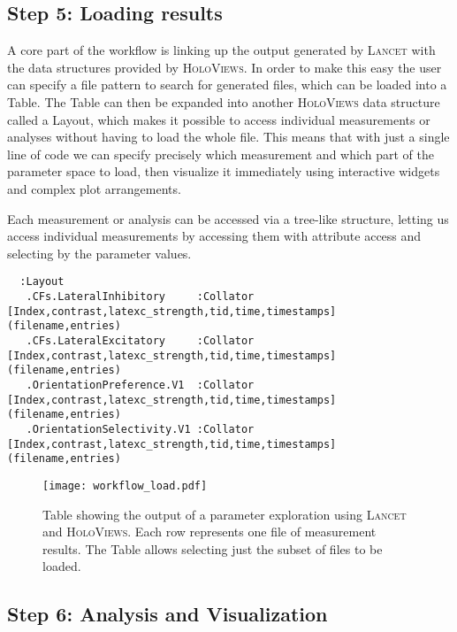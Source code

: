 \subsection{Step 5: Loading results}

A core part of the workflow is linking up the output generated by
\textsc{Lancet} with the data structures provided by
\textsc{HoloViews}. In order to make this easy the user can specify a
file pattern to search for generated files, which can be loaded into a
Table. The Table can then be expanded into another \textsc{HoloViews}
data structure called a Layout, which makes it possible to access
individual measurements or analyses without having to load the whole
file. This means that with just a single line of code we can specify
precisely which measurement and which part of the parameter space to
load, then visualize it immediately using interactive widgets and
complex plot arrangements.

Each measurement or analysis can be accessed via a tree-like
structure, letting us access individual measurements by accessing them
with attribute access and selecting by the parameter values.

\begin{minipage}{\linewidth}
\begin{lstlisting}
  :Layout
   .CFs.LateralInhibitory     :Collator   [Index,contrast,latexc_strength,tid,time,timestamps]   (filename,entries)
   .CFs.LateralExcitatory     :Collator   [Index,contrast,latexc_strength,tid,time,timestamps]   (filename,entries)
   .OrientationPreference.V1  :Collator   [Index,contrast,latexc_strength,tid,time,timestamps]   (filename,entries)
   .OrientationSelectivity.V1 :Collator   [Index,contrast,latexc_strength,tid,time,timestamps]   (filename,entries)
\end{lstlisting}
\end{minipage}


\begin{figure}
	\centering
        \texttt{[image: workflow\_load.pdf]}
	    \caption[Table summarizing results from parameter analysis in
          \textsc{Lancet} and \textsc{HoloViews}.]{Table showing the
          output of a parameter exploration using \textsc{Lancet} and
          \textsc{HoloViews}. Each row represents one file of
          measurement results. The Table allows selecting just the
          subset of files to be loaded.}
	\label{workflow_load}
\end{figure}


\subsection{Step 6: Analysis and Visualization}

